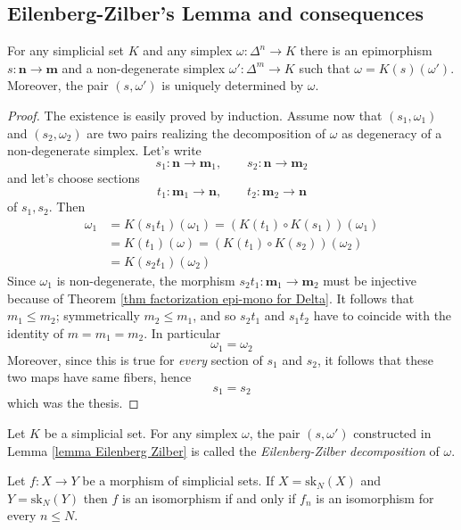 \begin{refsection}
\subsection{Eilenberg-Zilber's Lemma and consequences}

\begin{lemma} \label{lemma Eilenberg Zilber}
For any simplicial set $K$ and any simplex $\omega \colon \Delta^n \to K$ there is an epimorphism $s \colon \mathbf n \to \mathbf m$ and a non-degenerate simplex $\omega' \colon \Delta^m \to K$ such that $\omega = K(s)(\omega')$. Moreover, the pair $(s,\omega')$ is uniquely determined by $\omega$.
\end{lemma}

\begin{proof}
The existence is easily proved by induction. Assume now that $(s_1,\omega_1)$ and $(s_2,\omega_2)$ are two pairs realizing the decomposition of $\omega$ as degeneracy of a non-degenerate simplex. Let's write
\[
s_1 \colon \mathbf n \to \mathbf m_1, \qquad s_2 \colon \mathbf n \to \mathbf m_2
\]
and let's choose sections
\[
t_1 \colon \mathbf m_1 \to \mathbf n, \qquad t_2 \colon \mathbf m_2 \to \mathbf n
\]
of $s_1,s_2$. Then
\begin{align*}
\omega_1 & = K(s_1 t_1) (\omega_1) = (K(t_1) \circ K(s_1)) (\omega_1) \\
& = K(t_1)(\omega) = (K(t_1) \circ K(s_2))(\omega_2) \\
& = K(s_2 t_1)(\omega_2)
\end{align*}
Since $\omega_1$ is non-degenerate, the morphism $s_2 t_1 \colon \mathbf m_1 \to \mathbf m_2$ must be injective because of Theorem \ref{thm factorization epi-mono for Delta}. It follows that $m_1 \le m_2$; symmetrically $m_2 \le m_1$, and so $s_2 t_1$ and $s_1 t_2$ have to coincide with the identity of $m = m_1 = m_2$. In particular
\[
\omega_1 = \omega_2
\]
Moreover, since this is true for \emph{every} section of $s_1$ and $s_2$, it follows that these two maps have same fibers, hence
\[
s_1 = s_2
\]
which was the thesis.
\end{proof}

\begin{defin}
Let $K$ be a simplicial set. For any simplex $\omega$, the pair $(s,\omega')$ constructed in Lemma \ref{lemma Eilenberg Zilber} is called the \emph{Eilenberg-Zilber decomposition} of $\omega$.
\end{defin}

\begin{cor}
Let $f \colon X \to Y$ be a morphism of simplicial sets. If $X = \mathrm{sk}_N(X)$ and $Y = \mathrm{sk}_N(Y)$ then $f$ is an isomorphism if and only if $f_n$ is an isomorphism for every $n \le N$.
\end{cor}


\end{refsection}
